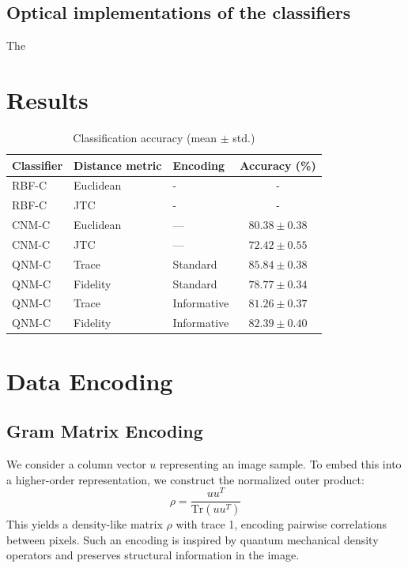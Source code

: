 \documentclass[twocolumn]{article} %
\begin{document}
\subsection{Optical implementations of the classifiers}
\label{subsec:optical-qnm}

The


\section{Results}

\begin{table}[htbp]
  \centering
  \caption{Classification accuracy (mean $\pm$ std.)}
  \label{tab:cls-results}
  \begin{tabular}{@{}lll c@{}}
    \toprule
    Classifier & Distance metric & Encoding & Accuracy (\%)\\ 
    \midrule
    RBF-C & Euclidean & - & - \\
    RBF-C & JTC & - & - \\[2pt]
    CNM-C & Euclidean & — & $80.38 \pm 0.38$ \\ 
    CNM-C & JTC & — & $72.42 \pm 0.55$ \\[2pt]
    QNM-C & Trace     & Standard     & \textbf{$85.84 \pm 0.38$} \\ 
    QNM-C & Fidelity  & Standard     & $78.77 \pm 0.34$ \\[2pt]
    QNM-C & Trace     & Informative  & $81.26 \pm 0.37$ \\ 
    QNM-C & Fidelity  & Informative  & \textbf{$82.39 \pm 0.40$} \\ 
    \bottomrule
  \end{tabular}
\end{table}




\section{Data Encoding}
\subsection{Gram Matrix Encoding}

We consider a column vector $u$ representing an image sample. To embed this into a higher-order representation, we construct the normalized outer product:
\[
\rho = \frac{uu^T}{\text{Tr}(uu^T)}
\]
This yields a density-like matrix $\rho$ with trace 1, encoding pairwise correlations between pixels. Such an encoding is inspired by quantum mechanical density operators and preserves structural information in the image.
\end{document}
